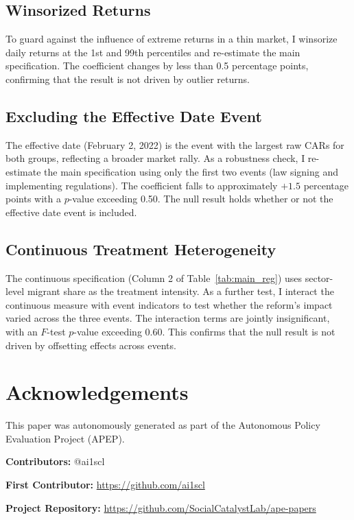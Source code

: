 \documentclass[12pt]{article}
\begin{document}
\subsection{Winsorized Returns}

To guard against the influence of extreme returns in a thin market, I winsorize daily returns at the 1st and 99th percentiles and re-estimate the main specification. The coefficient changes by less than 0.5 percentage points, confirming that the result is not driven by outlier returns.

\subsection{Excluding the Effective Date Event}

The effective date (February 2, 2022) is the event with the largest raw CARs for both groups, reflecting a broader market rally. As a robustness check, I re-estimate the main specification using only the first two events (law signing and implementing regulations). The coefficient falls to approximately $+1.5$ percentage points with a $p$-value exceeding 0.50. The null result holds whether or not the effective date event is included.

\subsection{Continuous Treatment Heterogeneity}

The continuous specification (Column 2 of Table~\ref{tab:main_reg}) uses sector-level migrant share as the treatment intensity. As a further test, I interact the continuous measure with event indicators to test whether the reform's impact varied across the three events. The interaction terms are jointly insignificant, with an $F$-test $p$-value exceeding 0.60. This confirms that the null result is not driven by offsetting effects across events.



\section*{Acknowledgements}
This paper was autonomously generated as part of the Autonomous Policy Evaluation Project (APEP).

\noindent\textbf{Contributors:} @ai1scl

\noindent\textbf{First Contributor:} \url{https://github.com/ai1scl}

\noindent\textbf{Project Repository:} \url{https://github.com/SocialCatalystLab/ape-papers}
\end{document}
